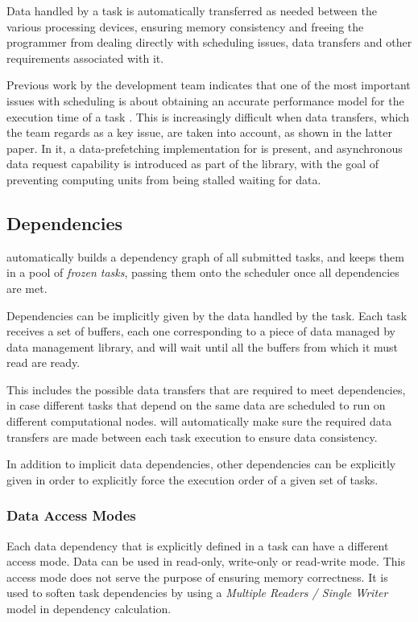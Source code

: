 \documentclass[main.tex]{subfiles}
\begin{document}
Data handled by a task is automatically transferred as needed between the various processing devices, ensuring memory consistency and freeing the programmer from dealing directly with scheduling issues, data transfers and other requirements associated with it.

Previous work by the \starpu development team indicates that one of the most important issues with scheduling is about obtaining an accurate performance model for the execution time of a task \cite{augonnet2010data,augonnet2010automatic}. This is increasingly difficult when data transfers, which the team regards as a key issue, are taken into account, as shown in the latter paper. In it, a data-prefetching implementation for \gpus is present, and asynchronous data request capability is introduced as part of the \starpu library, with the goal of preventing computing units from being stalled waiting for data.

\subsection{Dependencies}

\starpu automatically builds a dependency graph of all submitted tasks, and keeps them in a pool of \emph{frozen tasks}, passing them onto the scheduler once all dependencies are met.

Dependencies can be implicitly given by the data handled by the task. Each task receives a set of buffers, each one corresponding to a piece of data managed by \starpu data management library, and will wait until all the buffers from which it must read are ready.

This includes the possible data transfers that are required to meet dependencies, in case different tasks that depend on the same data are scheduled to run on different computational nodes. \starpu will automatically make sure the required data transfers are made between each task execution to ensure data consistency.

In addition to implicit data dependencies, other dependencies can be explicitly given in order to explicitly force the execution order of a given set of tasks.

\subsubsection{Data Access Modes} \label{sec:starpu:data_access}

Each data dependency that is explicitly defined in a task can have a different access mode. Data can be used in read-only, write-only or read-write mode. This access mode does not serve the purpose of ensuring memory correctness. It is used to soften task dependencies by using a \emph{Multiple Readers / Single Writer} model in dependency calculation.
\end{document}

